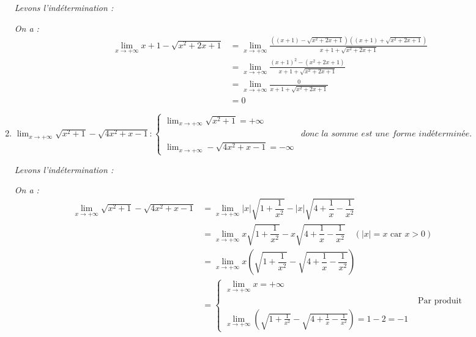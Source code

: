 \documentclass[12pt,a4paper]{article}
\begin{document}
\begin{enumerate}
    \textit{Levons l'indétermination :}
    
    \textit{On a :}
    \begin{align*}
        \displaystyle \lim_{x \to +\infty} x + 1 - \sqrt{x^2 + 2x + 1} &= \lim_{x \to +\infty} \frac{((x + 1) - \sqrt{x^2 + 2x + 1})((x + 1) + \sqrt{x^2 + 2x + 1})}{x + 1 + \sqrt{x^2 + 2x + 1}} \\
        &= \lim_{x \to +\infty} \frac{(x + 1)^2 - (x^2 + 2x + 1)}{x + 1 + \sqrt{x^2 + 2x + 1}} \\
        &= \lim_{x \to +\infty} \frac{0}{x + 1 + \sqrt{x^2 + 2x + 1}} \\
        &= 0
    \end{align*}
    
    \vspace{0.2cm}
    
     

    \vspace{0.6cm}

    \item 
    $
    \displaystyle \lim_{x \to +\infty} \sqrt{x^2 + 1} - \sqrt{4x^2 + x - 1}:
    \begin{cases}
    \displaystyle \lim_{x \to +\infty} \sqrt{x^2 + 1} = +\infty\\[3mm]
    &\textit{donc la somme est une forme indéterminée.}\\
    \displaystyle \lim_{x \to +\infty} -\sqrt{4x^2 + x - 1} = -\infty
    \end{cases}
    $

    \textit{Levons l'indétermination :}
    
    \textit{On a :}
    \begin{align*}
        \displaystyle \lim_{x \to +\infty} \sqrt{x^2 + 1} - \sqrt{4x^2 + x - 1} &= \lim_{x \to +\infty} |x|\sqrt{1 + \dfrac{1}{x^2}} - |x|\sqrt{4 + \dfrac{1}{x} - \dfrac{1}{x^2}} \\
        &= \lim_{x \to +\infty} x\sqrt{1 + \dfrac{1}{x^2}} - x\sqrt{4 + \dfrac{1}{x} - \dfrac{1}{x^2}} \quad (|x| = x \text{ car } x > 0) \\
        &= \lim_{x \to +\infty} x \left( \sqrt{1 + \dfrac{1}{x^2}} - \sqrt{4 + \dfrac{1}{x} - \dfrac{1}{x^2}} \right) \\
        &= \begin{cases}
    \displaystyle \lim_{x \to +\infty} x = +\infty \\[3mm]
    &\text{ Par produit }\\
    \displaystyle \lim_{x \to +\infty} \left( \sqrt{1 + \frac{1}{x^2}} - \sqrt{4 + \frac{1}{x} - \frac{1}{x^2}} \right) = 1 - 2 = -1
    \end{cases}
    \end{align*}
    

\end{enumerate}
\end{document}
